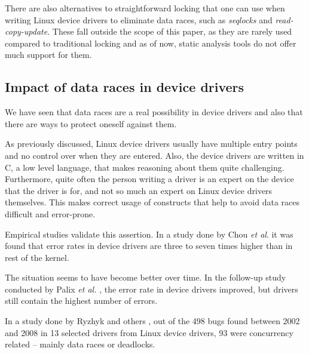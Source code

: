 \documentclass[..thesis.tex]{subfiles}
\begin{document}

There are also alternatives to straightforward locking that one can use when writing Linux device drivers to eliminate data races, such as \textit{seqlocks} and \textit{read-copy-update}. These fall outside the scope of this paper, as they are rarely used compared to traditional locking and as of now, static analysis tools do not offer much support for them. 


\subsection{Impact of data races in device drivers}

We have seen that data races are a real possibility in device drivers and also that there are ways to protect oneself against them. 


As previously discussed, Linux device drivers usually have multiple entry points and no control over when they are entered. Also, the device drivers are written in C, a low level language, that makes reasoning about them quite challenging. Furthermore, quite often the person writing a driver is an expert on the device that the driver is for, and not so much an expert on Linux device drivers themselves. This makes correct usage of constructs that help to avoid data races difficult and error-prone.




Empirical studies validate this assertion. In a study done by Chou \textit{et al}. \cite{chou_empirical_2001} it was found that error rates in device drivers are three to seven times higher than in rest of the kernel. 

The situation seems to have become better over time. In the follow-up study conducted by Palix \textit{et al.} \cite{palix_faults_2011}, the error rate in device drivers improved, but drivers still contain the highest number of errors.

In a study done by Ryzhyk and others \cite{ryzhyk_dingo_2009}, out of the 498 bugs found between 2002 and 2008 in 13 selected drivers from Linux device drivers, 93 were concurrency related -- mainly data races or deadlocks. 
\end{document}
